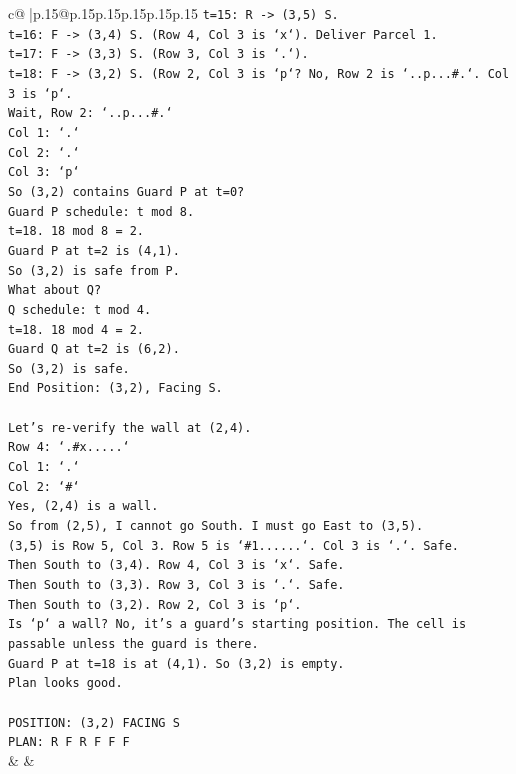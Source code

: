 \documentclass{article}
\begin{document}
{\begin{supertabular}{c@{$\;$}|p{.15\linewidth}@{}p{.15\linewidth}p{.15\linewidth}p{.15\linewidth}p{.15\linewidth}p{.15\linewidth}}
{{{\texttt{t=15: R {-}> (3,5) S.} \\
\texttt{t=16: F {-}> (3,4) S. (Row 4, Col 3 is `x`). Deliver Parcel 1.} \\
\texttt{t=17: F {-}> (3,3) S. (Row 3, Col 3 is `.`).} \\
\texttt{t=18: F {-}> (3,2) S. (Row 2, Col 3 is `p`? No, Row 2 is `..p...\#.`. Col 3 is `p`.} \\
\texttt{Wait, Row 2: `..p...\#.`} \\
\texttt{Col 1: `.`} \\
\texttt{Col 2: `.`} \\
\texttt{Col 3: `p`} \\
\texttt{So (3,2) contains Guard P at t=0?} \\
\texttt{Guard P schedule: t mod 8.} \\
\texttt{t=18. 18 mod 8 = 2.} \\
\texttt{Guard P at t=2 is (4,1).} \\
\texttt{So (3,2) is safe from P.} \\
\texttt{What about Q?} \\
\texttt{Q schedule: t mod 4.} \\
\texttt{t=18. 18 mod 4 = 2.} \\
\texttt{Guard Q at t=2 is (6,2).} \\
\texttt{So (3,2) is safe.} \\
\texttt{End Position: (3,2), Facing S.} \\
\\ 
\texttt{Let's re{-}verify the wall at (2,4).} \\
\texttt{Row 4: `.\#x.....`} \\
\texttt{Col 1: `.`} \\
\texttt{Col 2: `\#`} \\
\texttt{Yes, (2,4) is a wall.} \\
\texttt{So from (2,5), I cannot go South. I must go East to (3,5).} \\
\texttt{(3,5) is Row 5, Col 3. Row 5 is `\#1......`. Col 3 is `.`. Safe.} \\
\texttt{Then South to (3,4). Row 4, Col 3 is `x`. Safe.} \\
\texttt{Then South to (3,3). Row 3, Col 3 is `.`. Safe.} \\
\texttt{Then South to (3,2). Row 2, Col 3 is `p`.} \\
\texttt{Is `p` a wall? No, it's a guard's starting position. The cell is passable unless the guard is there.} \\
\texttt{Guard P at t=18 is at (4,1). So (3,2) is empty.} \\
\texttt{Plan looks good.} \\
\\ 
\texttt{POSITION: (3,2) FACING S} \\
\texttt{PLAN: R F R F F F} \\
            }
        }
    }
    & & \\ \\


\end{supertabular}}
\end{document}
